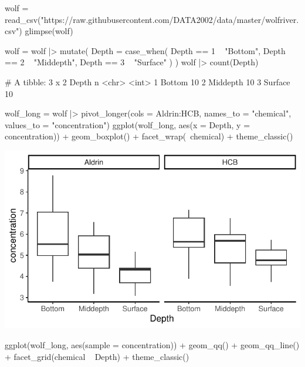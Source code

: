 \documentclass[a4paper]{article}
\begin{document}
\begin{Schunk}
\begin{Sinput}
wolf = read_csv("https://raw.githubusercontent.com/DATA2002/data/master/wolfriver.csv")
glimpse(wolf)
\end{Sinput}
\begin{Sinput}
wolf = wolf |> mutate(
  Depth = case_when(
    Depth == 1 ~ "Bottom",
    Depth == 2 ~ "Middepth",
    Depth == 3 ~ "Surface"
  )
)
wolf |> count(Depth)
\end{Sinput}
\begin{Soutput}
# A tibble: 3 x 2
  Depth        n
  <chr>    <int>
1 Bottom      10
2 Middepth    10
3 Surface     10
\end{Soutput}
\begin{Sinput}
wolf_long = wolf |> 
  pivot_longer(cols = Aldrin:HCB, names_to = "chemical", 
         values_to = "concentration") 
ggplot(wolf_long, aes(x = Depth, y = concentration)) + 
  geom_boxplot() + 
  facet_wrap(~chemical) +
  theme_classic()
\end{Sinput}


{\centering \includegraphics[width=\maxwidth]{figure/listings-unnamed-chunk-257-1} 

}

\begin{Sinput}
ggplot(wolf_long, aes(sample = concentration)) + 
  geom_qq() + geom_qq_line() + 
  facet_grid(chemical ~ Depth) +
  theme_classic()
\end{Sinput}



\end{Schunk}
\end{document}
